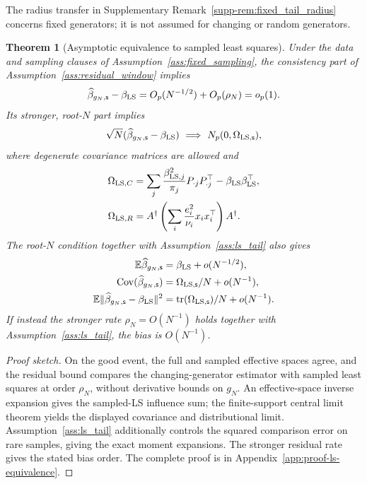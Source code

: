 \documentclass[pdflatex,iicol,sn-mathphys-ay]{sn-jnl}
\theoremstyle{thmstyleone}
\newtheorem{theorem}{Theorem}
\theoremstyle{thmstylethree}
\theoremstyle{thmstyletwo}
\newcommand{\tr}{\mathrm{tr}}
\newcommand{\E}{\mathbb E}
\newcommand{\norm}[1]{\lVert#1\rVert}
\begin{document}
The radius transfer in Supplementary Remark~\ref{supp-rem:fixed_tail_radius} concerns fixed
generators; it is not assumed for changing or random generators.

\begin{theorem}[Asymptotic equivalence to sampled least squares]
\label{thm:ls_equivalence}
Under the data and sampling clauses of Assumption~\ref{ass:fixed_sampling},
the consistency part of
Assumption~\ref{ass:residual_window} implies
\[
 \widehat\beta_{g_N,\mathsf{s}}-\beta_{\rm LS}
       =O_p(N^{-1/2})+O_p(\rho_N)=o_p(1).
\]
Its stronger, root-$N$ part implies
\begin{equation}\label{eq:ls_clt}
 \sqrt N(\widehat\beta_{g_N,\mathsf{s}}-\beta_{\rm LS})
       \ \Longrightarrow\ N_p(0,\Omega_{{\rm LS},\mathsf{s}}),
\end{equation}
where degenerate covariance matrices are allowed and
\begin{align*}
 \Omega_{{\rm LS},C}
  &=\sum_j\frac{\beta_{{\rm LS},j}^2}{\pi_j}
       P_{\cdot j}P_{\cdot j}^\top-\beta_{\rm LS}\beta_{\rm LS}^\top,
       \\
 \Omega_{{\rm LS},R}
  &=A^\dagger\left(\sum_i\frac{e_i^2}{\nu_i}x_ix_i^\top\right)A^\dagger.
\end{align*}
The root-$N$ condition together with Assumption~\ref{ass:ls_tail} also gives
\begin{align}
 \E\widehat\beta_{g_N,\mathsf{s}}&=\beta_{\rm LS}+o(N^{-1/2}),\nonumber\\
 \operatorname{Cov}(\widehat\beta_{g_N,\mathsf{s}})
      &=\Omega_{{\rm LS},\mathsf{s}}/N+o(N^{-1}),\label{eq:ls_exact_moments}\\
 \E\norm{\widehat\beta_{g_N,\mathsf{s}}-\beta_{\rm LS}}^2
      &=\tr(\Omega_{{\rm LS},\mathsf{s}})/N+o(N^{-1}).\nonumber
\end{align}
If instead the stronger rate $\rho_N=O(N^{-1})$ holds together with
Assumption~\ref{ass:ls_tail}, the bias is $O(N^{-1})$.
\end{theorem}
\begin{proof}[Proof sketch]
On the good event, the full and sampled effective spaces agree, and the
residual bound compares the changing-generator estimator with sampled
least squares at order $\rho_N$, without derivative bounds on $g_N$.
An effective-space inverse expansion gives the sampled-LS influence sum;
the finite-support central limit theorem yields the displayed covariance
and distributional limit. Assumption~\ref{ass:ls_tail} additionally controls
the squared comparison error on rare samples, giving the exact moment
expansions. The stronger residual rate gives the stated bias order.
The complete proof is in Appendix~\ref{app:proof-ls-equivalence}.
\end{proof}
\end{document}
